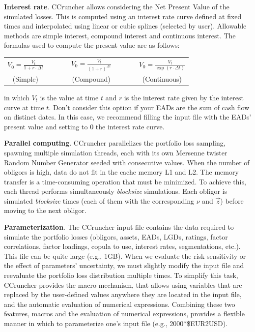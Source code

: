 \documentclass[11pt,fleqn]{book} %
\begin{document}
\textbf{Interest rate}. CCruncher allows considering the Net Present Value 
of the simulated losses. This is computed using an interest rate curve 
defined at fixed times and interpolated using linear or cubic splines 
(selected by user). Allowable methods are simple interest, compound interest 
and continuous interest. The formulas used to compute the present value are
as follows:
\begin{center}
	\begin{tabular}{ccccc}
		$V_0 = \frac{V_t}{1+r \cdot \Delta t}$ & $\qquad$ &
		$V_0 = \frac{V_t}{(1+r)^{\Delta t}}$ & $\qquad$ &
		$V_0 = \frac{V_t}{\exp(r \cdot \Delta t)}$ \\
		(Simple) & $\qquad$ & (Compound) & $\qquad$ & (Continuous)
	\end{tabular}
\end{center}
in which $V_t$ is the value at time $t$ and $r$ is the interest rate given 
by the interest curve at time $t$. Don't consider this option if your EADs
are the sum of cash flow on distinct dates. In this case, we recommend 
filling the input file with the EADs' present value and setting to $0$ the 
interest rate curve.

\textbf{Parallel computing}. 
CCruncher parallelizes the portfolio loss sampling, spawning multiple 
simulation threads, each with its own Mersenne twister Random Number 
Generator seeded with consecutive values. When the number of obligors is 
high, data do not fit in the cache memory L1 and L2. The memory transfer is 
a time-consuming operation that must be minimized. To achieve this, each
thread performs simultaneously \emph{blocksize} simulations. Each obligor is 
simulated \emph{blocksize} times (each of them with the corresponding $\nu$ 
and $\vec{z}$) before moving to the next obligor.

\textbf{Parameterization}. 
The CCruncher input file contains the data required to simulate the portfolio
losses (obligors, assets, EADs, LGDs, ratings, factor correlations, factor
loadings, copula to use, interest rates, segmentations, etc.). This file can 
be quite large (e.g., 1GB). When we evaluate the risk sensitivity or the effect 
of parameters' uncertainty, we must slightly modify the input file and 
reevaluate the portfolio loss distribution multiple times. To simplify this 
task, CCruncher provides the macro mechanism, that allows using variables 
that are replaced by the user-defined values anywhere they are located in 
the input file, and the automatic evaluation of numerical expressions. 
Combining these two features, macros and the evaluation of numerical 
expressions, provides a flexible manner in which to parameterize one's input 
file (e.g., 2000*\$EUR2USD). 
\end{document}
